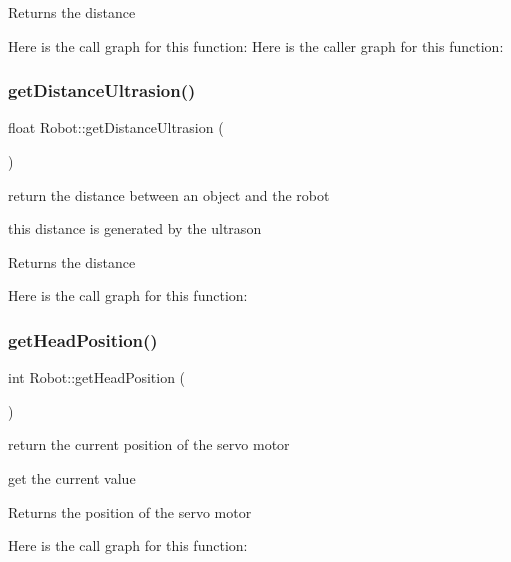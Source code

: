 \begin{DoxyReturn}{Returns}
the distance 
\end{DoxyReturn}
Here is the call graph for this function\+:
Here is the caller graph for this function\+:
\mbox{\label{class_robot_ae3e977cb38b69c31faafd993a2b4054d}} 
\subsubsection{\texorpdfstring{get\+Distance\+Ultrasion()}{getDistanceUltrasion()}}
{\footnotesize\ttfamily float Robot\+::get\+Distance\+Ultrasion (\begin{DoxyParamCaption}{ }\end{DoxyParamCaption})}



return the distance between an object and the robot 

this distance is generated by the ultrason

\begin{DoxyReturn}{Returns}
the distance 
\end{DoxyReturn}
Here is the call graph for this function\+:
\mbox{\label{class_robot_a34039e49403d45d263e834f11d9c85e9}} 
\subsubsection{\texorpdfstring{get\+Head\+Position()}{getHeadPosition()}}
{\footnotesize\ttfamily int Robot\+::get\+Head\+Position (\begin{DoxyParamCaption}{ }\end{DoxyParamCaption})}



return the current position of the servo motor 

get the current value

\begin{DoxyReturn}{Returns}
the position of the servo motor 
\end{DoxyReturn}
Here is the call graph for this function\+:
\mbox{\label{class_robot_a69dad285c5a86e600b2ad94e7d30cf8b}} 
